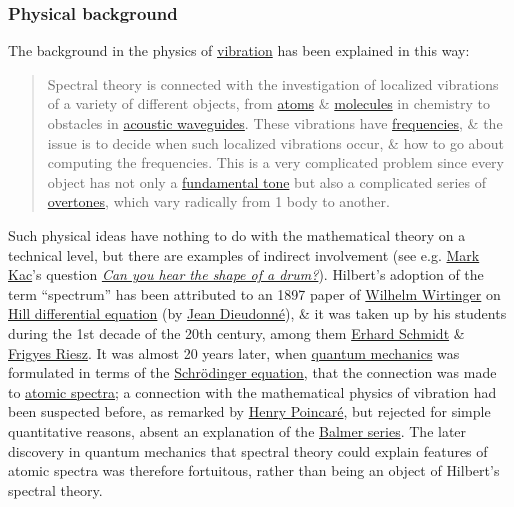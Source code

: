 \documentclass{article}
\begin{document}
\subsubsection{Physical background}
The background in the physics of \href{https://en.wikipedia.org/wiki/Vibration}{vibration} has been explained in this way:
\begin{quotation}
	Spectral theory is connected with the investigation of localized vibrations of a variety of different objects, from \href{https://en.wikipedia.org/wiki/Atom}{atoms} \& \href{https://en.wikipedia.org/wiki/Molecule}{molecules} in chemistry to obstacles in \href{https://en.wikipedia.org/wiki/Waveguide_(acoustics)}{acoustic waveguides}. These vibrations have \href{https://en.wikipedia.org/wiki/Frequency}{frequencies}, \& the issue is to decide when such localized vibrations occur, \& how to go about computing the frequencies. This is a very complicated problem since every object has not only a \href{https://en.wikipedia.org/wiki/Fundamental_tone}{fundamental tone} but also a complicated series of \href{https://en.wikipedia.org/wiki/Overtone}{overtones}, which vary radically from 1 body to another.
\end{quotation}
Such physical ideas have nothing to do with the mathematical theory on a technical level, but there are examples of indirect involvement (see e.g. \href{https://en.wikipedia.org/wiki/Mark_Kac}{\sc Mark Kac}'s question \href{https://en.wikipedia.org/wiki/Can_you_hear_the_shape_of_a_drum%3F}{\it Can you hear the shape of a drum?}). {\sc Hilbert}'s adoption of the term ``spectrum'' has been attributed to an 1897 paper of \href{https://en.wikipedia.org/wiki/Wilhelm_Wirtinger}{\sc Wilhelm Wirtinger} on \href{https://en.wikipedia.org/wiki/Hill_differential_equation}{Hill differential equation} (by \href{https://en.wikipedia.org/wiki/Jean_Dieudonn%C3%A9}{\sc Jean Dieudonn\'e}), \& it was taken up by his students during the 1st decade of the 20th century, among them \href{https://en.wikipedia.org/wiki/Erhard_Schmidt}{\sc Erhard Schmidt} \& \href{https://en.wikipedia.org/wiki/Frigyes_Riesz}{\sc Frigyes Riesz}. It was almost 20 years later, when \href{https://en.wikipedia.org/wiki/Quantum_mechanics}{quantum mechanics} was formulated in terms of the \href{https://en.wikipedia.org/wiki/Schr%C3%B6dinger_equation}{Schr\"odinger equation}, that the connection was made to \href{https://en.wikipedia.org/wiki/Atomic_spectra}{atomic spectra}; a connection with the mathematical physics of vibration had been suspected before, as remarked by \href{https://en.wikipedia.org/wiki/Henri_Poincar%C3%A9}{\sc Henry Poincar\'e}, but rejected for simple quantitative reasons, absent an explanation of the \href{https://en.wikipedia.org/wiki/Balmer_series}{Balmer series}. The later discovery in quantum mechanics that spectral theory could explain features of atomic spectra was therefore fortuitous, rather than being an object of {\sc Hilbert}'s spectral theory.
\end{document}
